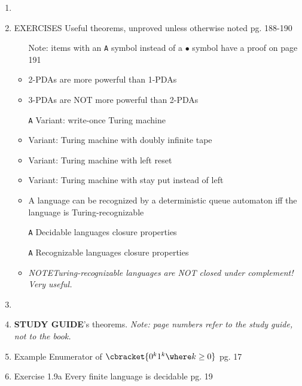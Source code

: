 \documentclass[12pt]{article} %
\newcommand{\theoremitem}[3]{\item #1 \quad #2 \dotfill #3}
\newcommand{\noteitem}[1]{\item \textit{NOTE\quad #1}}
\newenvironment{theoremlist} {
    \begin{enumerate}[nosep,leftmargin=*,label={}]
} {
    \end{enumerate}
}
\begin{document}
\begin{theoremlist}
    \item[]
    \theoremitem{EXERCISES}
    {Useful theorems, unproved unless otherwise noted}
    {pg. 188-190}
    \begin{itemize}[nosep]
        \item[] Note: items with an \texttt{A} symbol instead of a $\bullet$ symbol have a proof on page 191
        \item 2-PDAs are more powerful than 1-PDAs
        \item 3-PDAs are NOT more powerful than 2-PDAs
        \item[\texttt{A}] Variant: write-once Turing machine
        \item Variant: Turing machine with doubly infinite tape
        \item Variant: Turing machine with left reset
        \item Variant: Turing machine with stay put instead of left
        \item A language can be recognized by a deterministic queue automaton iff the language is Turing-recognizable
        \item[\texttt{A}] Decidable languages closure properties
        \item[\texttt{A}] Recognizable languages closure properties
        \noteitem{Turing-recognizable languages are NOT closed under complement! Very useful.}
    \end{itemize}

    \item[]
    \item[]
    \textbf{STUDY GUIDE}'s theorems. \textit{Note: page numbers refer to the study guide, not to the book.}
    \theoremitem{Example}
    {Enumerator of $\cbracket{0^k 1^k \where k \geq 0}$}
    {pg. 17}
    \theoremitem{Exercise 1.9a}
    {Every finite language is decidable}
    {pg. 19}
\end{theoremlist}
\end{document}
